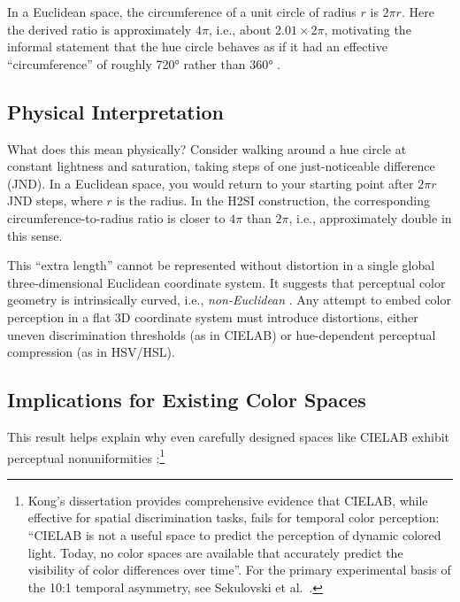 In a Euclidean space, the circumference of a unit circle of radius $r$ is $2\pi r$. Here the derived ratio is approximately $4\pi$, i.e., about $2.01\times 2\pi$, motivating the informal statement that the hue circle behaves as if it had an effective ``circumference'' of roughly 720° rather than 360° \citep[p.~3]{nolle2013h2si_ms}.

\subsection{Physical Interpretation}

What does this mean physically? Consider walking around a hue circle at constant lightness and saturation, taking steps of one just-noticeable difference (JND). In a Euclidean space, you would return to your starting point after $2\pi r$ JND steps, where $r$ is the radius. In the H2SI construction, the corresponding circumference-to-radius ratio is closer to $4\pi$ than $2\pi$, i.e., approximately double in this sense.

This ``extra length'' cannot be represented without distortion in a single global three-dimensional Euclidean coordinate system. It suggests that perceptual color geometry is intrinsically curved, i.e., \emph{non-Euclidean} \citep{nolle2012,roberti2023}. Any attempt to embed color perception in a flat 3D coordinate system must introduce distortions, either uneven discrimination thresholds (as in CIELAB) or hue-dependent perceptual compression (as in HSV/HSL).

\subsection{Implications for Existing Color Spaces}

This result helps explain why even carefully designed spaces like CIELAB exhibit perceptual nonuniformities \citep[p.~530]{kong2021}:\footnote{Kong's dissertation provides comprehensive evidence that CIELAB, while effective for spatial discrimination tasks, fails for temporal color perception: ``CIELAB is not a useful space to predict the perception of dynamic colored light. Today, no color spaces are available that accurately predict the visibility of color differences over time''. For the primary experimental basis of the 10:1 temporal asymmetry, see Sekulovski et al.~\citep[p.~113]{sekulovski2007}.}

